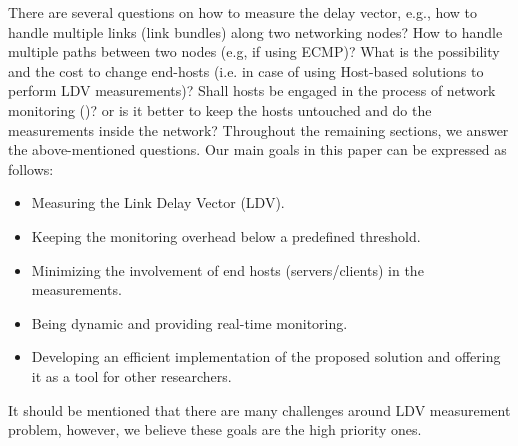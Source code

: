 \documentclass[10pt, journal, letterpaper]{IEEEtran}
\begin{document}
There are several questions on how to measure the delay vector, e.g., how to handle multiple links (link bundles) along two networking nodes? How to handle multiple paths between two nodes (e.g, if using ECMP)? What is the possibility and the cost to change end-hosts (i.e. in case of using Host-based solutions to perform LDV measurements)? Shall hosts be engaged in the process of network monitoring (\cite{guo2015pingmesh})? or is it better to keep the hosts untouched and do the measurements inside the network? Throughout the remaining sections, we answer the above-mentioned questions. Our main goals in this paper can be expressed as follows: 
\begin{itemize}
\item Measuring the Link Delay Vector (LDV). 
\item Keeping the monitoring overhead below a predefined threshold. 
\item Minimizing the involvement of end hosts (servers/clients) in the measurements.
\item Being dynamic and providing real-time monitoring. %
\item Developing an efficient implementation of the proposed solution and offering it as a tool for other researchers.
\end{itemize}
It should be mentioned that there are many challenges around LDV measurement problem, however, we believe these goals are the high priority ones.
\end{document}
